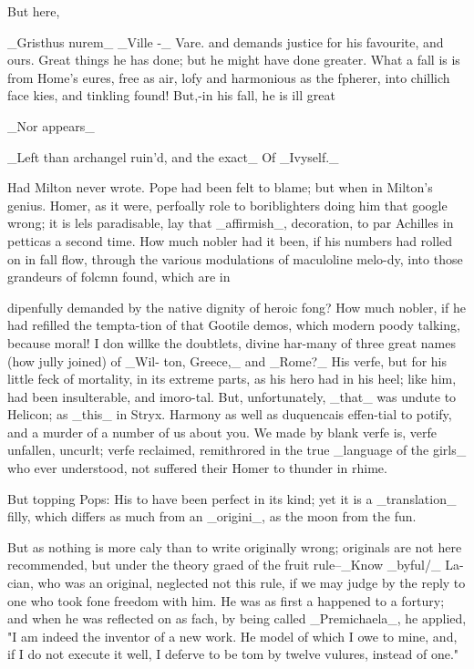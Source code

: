 \documentclass{article}
\begin{document}
But here,

\_Gristhus nurem\_ \_Ville -\_ Vare. and demands justice for his favourite, and ours. Great things he has done; but he might have done greater. What a fall is is from Home’s eures, free as air, lofy and harmonious as the fpherer, into chillich face kies, and tinkling found! But,-in his fall, he is ill great

\_Nor appears\_

\_Left than archangel ruin'd, and the exact\_ Of \_Ivyself.\_

Had Milton never wrote. Pope had been felt to blame; but when in Milton’s genius. Homer, as it were, perfoally role to boriblighters doing him that google wrong; it is lels paradisable, lay that \_affirmish\_, decoration, to par Achilles in petticas a second time. How much nobler had it been, if his numbers had rolled on in fall flow, through the various modulations of maculoline melo-dy, into those grandeurs of folcmn found, which are in

dipenfully demanded by the native dignity of heroic fong? How much nobler, if he had refilled the tempta-tion of that Gootile demos, which modern poody talking, because moral! I don willke the doubtlets, divine har-many of three great names (how jully joined) of \_Wil- ton, Greece,\_ and \_Rome?\_ His verfe, but for his little feck of mortality, in its extreme parts, as his hero had in his heel; like him, had been insulterable, and imoro-tal. But, unfortunately, \_that\_ was undute to Helicon; as \_this\_ in Stryx. Harmony as well as duquencais effen-tial to potify, and a murder of a number of us about you. We made by blank verfe is, verfe unfallen, uncurlt; verfe reclaimed, remithrored in the true \_language of the girls\_ who ever understood, not suffered their Homer to thunder in rhime.

But topping Pops: His to have been perfect in its kind; yet it is a \_translation\_ filly, which differs as much from an \_origini\_, as the moon from the fun.

But as nothing is more caly than to write originally wrong; originals are not here recommended, but under the theory graed of the fruit rule--\_Know \_byful/\_ La- cian, who was an original, neglected not this rule, if we may judge by the reply to one who took fone freedom with him. He was as first a happened to a fortury; and when he was reflected on as fach, by being called \_Premichaela\_, he applied, "I am indeed the inventor of a new work. He model of which I owe to mine, and, if I do not execute it well, I deferve to be tom by twelve vulures, instead of one."
\end{document}
